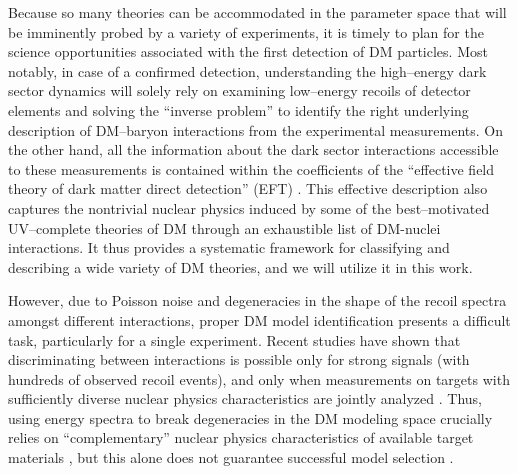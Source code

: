 \documentclass[11pt]{article}
\begin{document}
Because so many theories can be accommodated in the parameter space that will be imminently probed by a variety of experiments, it is timely to plan for the science opportunities associated with the first detection of DM particles. Most notably, in case of a confirmed detection, understanding the high--energy dark sector dynamics will solely rely on examining low--energy recoils of detector elements and solving the ``inverse problem'' to identify the right underlying description of DM--baryon interactions from the experimental measurements. On the other hand, all the information about the dark sector interactions accessible to these measurements is contained within the coefficients of the ``effective field theory of dark matter direct detection'' (EFT) \cite{Fitzpatrick:2012ix, Anand:2013yka}. This effective description also captures the nontrivial nuclear physics induced by some of the best--motivated UV--complete theories of DM \cite{Gresham:2014vja, Gluscevic:2015sqa} through an exhaustible list of DM-nuclei interactions. It thus provides a systematic framework for classifying and describing a wide variety of DM theories, and we will utilize it in this work. 
 
However, due to Poisson noise and degeneracies in the shape of the recoil spectra amongst different interactions, proper DM model identification presents a difficult task, particularly for a single experiment. Recent studies have shown that discriminating between interactions is possible only for strong signals (with hundreds of observed recoil events), and only when measurements on targets with sufficiently diverse nuclear physics characteristics are jointly analyzed \cite{Gluscevic:2015sqa}. Thus, using energy spectra to break degeneracies in the DM modeling space crucially relies on ``complementary'' nuclear physics characteristics of available target materials \cite{McDermott:2011hx,Peter:2013aha,Gluscevic:2014vga,Catena:2014epa,Catena:2014hla,Dent:2015zpa,Gluscevic:2015sqa,Ruppin:2014bra}, but this alone does not guarantee successful model selection \cite{Gluscevic:2014vga,Gluscevic:2015sqa}.
\end{document}
